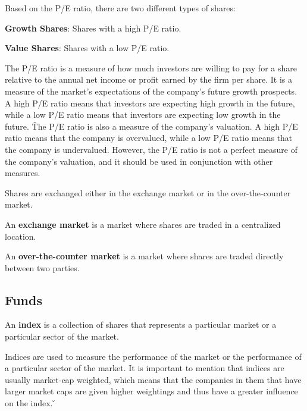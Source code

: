 Based on the P/E ratio, there are two different types of shares:
\bit
\item \textbf{Growth Shares}: Shares with a high P/E ratio.
\item \textbf{Value Shares}: Shares with a low P/E ratio.
\eit

The P/E ratio is a measure of how much investors are willing to pay for a share relative to the annual net income or
profit earned by the firm per share. It is a measure of the market's expectations of the company's future growth
prospects. A high P/E ratio means that investors are expecting high growth in the future, while a low P/E ratio means
that investors are expecting low growth in the future. \v

The P/E ratio is also a measure of the company's valuation. A high P/E ratio means that the company is overvalued, while
a low P/E ratio means that the company is undervalued. However, the P/E ratio is not a perfect measure of the company's
valuation, and it should be used in conjunction with other measures.

Shares are exchanged either in the exchange market or in the over-the-counter market.

An \textbf{exchange market} is a market where shares are traded in a centralized location.
\ed

An \textbf{over-the-counter market} is a market where shares are traded directly between two parties.
\ed

\subsection{Funds}

\bd[Index]
An \textbf{index} is a collection of shares that represents a particular market or a particular sector of the market.
\ed

Indices are used to measure the performance of the market or the performance of a particular sector of the market. It
is important to mention that indices are usually market-cap weighted, which means that the companies in them that
have larger market caps are given higher weightings and thus have a greater influence on the index. \v

